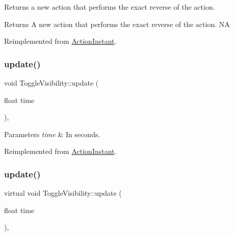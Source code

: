 Returns a new action that performs the exact reverse of the action.

\begin{DoxyReturn}{Returns}
A new action that performs the exact reverse of the action.  NA 
\end{DoxyReturn}


Reimplemented from \hyperlink{classActionInstant_aeb1870802c509e1f4111c863a28e9262}{Action\+Instant}.

\mbox{\label{classToggleVisibility_a7a00173aaded366259698c37ebbb2ca0}} 
\subsubsection{\texorpdfstring{update()}{update()}\hspace{0.1cm}{\footnotesize\ttfamily [1/2]}}
{\footnotesize\ttfamily void Toggle\+Visibility\+::update (\begin{DoxyParamCaption}\item[{float}]{time }\end{DoxyParamCaption})\hspace{0.3cm}{\ttfamily [override]}, {\ttfamily [virtual]}}


\begin{DoxyParams}{Parameters}
{\em time} & In seconds. \\
\hline
\end{DoxyParams}


Reimplemented from \hyperlink{classActionInstant_a59875bf08cd1f58c0c8c6693ac540ade}{Action\+Instant}.

\mbox{\label{classToggleVisibility_a2d217511fd3f28ee096e0de1aacf21b4}} 
\subsubsection{\texorpdfstring{update()}{update()}\hspace{0.1cm}{\footnotesize\ttfamily [2/2]}}
{\footnotesize\ttfamily virtual void Toggle\+Visibility\+::update (\begin{DoxyParamCaption}\item[{float}]{time }\end{DoxyParamCaption})\hspace{0.3cm}{\ttfamily [override]}, {\ttfamily [virtual]}}


